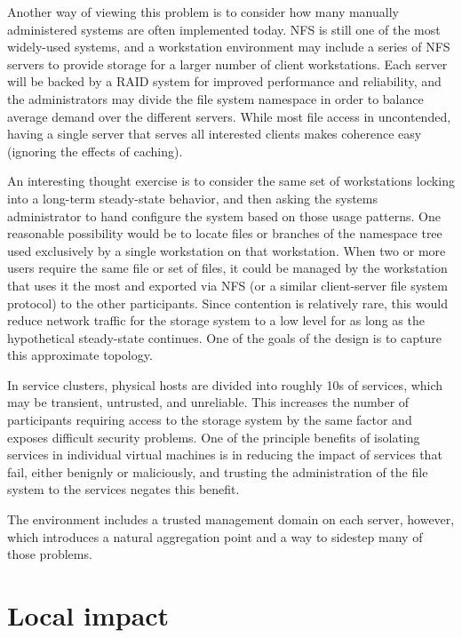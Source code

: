 Another way of viewing this problem is to consider how many manually administered systems are often implemented today. NFS \cite{callaghan} is still one of the most widely-used systems, and a workstation environment may include a series of NFS servers to provide storage for a larger number of client workstations. Each server will be backed by a RAID \cite{patterson} system for improved performance and reliability, and the administrators may divide the file system namespace in order to balance average demand over the different servers. While most file access in uncontended, having a single server that serves all interested clients makes coherence easy (ignoring the effects of caching).

An interesting thought exercise is to consider the same set of workstations locking into a long-term steady-state behavior, and then asking the systems administrator to hand configure the system based on those usage patterns. One reasonable possibility would be to locate files or branches of the namespace tree used exclusively by a single workstation on that workstation. When two or more users require the same file or set of files, it could be managed by the workstation that uses it the most and exported via NFS (or a similar client-server file system protocol) to the other participants. Since contention is relatively rare, this would reduce network traffic for the storage system to a low level for as long as the hypothetical steady-state continues. One of the goals of the \envoy design is to capture this approximate topology.

In service clusters, physical hosts are divided into roughly 10s of services, which may be transient, untrusted, and unreliable. This increases the number of participants requiring access to the storage system by the same factor and exposes difficult security problems. One of the principle benefits of isolating services in individual virtual machines is in reducing the impact of services that fail, either benignly or maliciously, and trusting the administration of the file system to the services negates this benefit.

The environment includes a trusted management domain on each server, however, which introduces a natural aggregation point and a way to sidestep many of those problems.

\section{Local impact}

